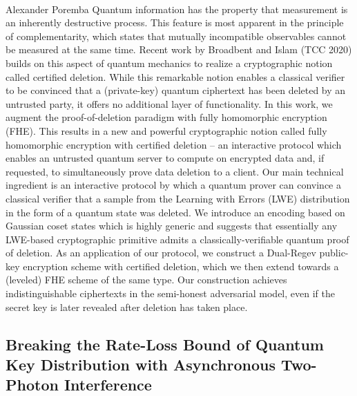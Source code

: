 \documentclass{article}%
\begin{document}
\paragraph{}%
Alexander Poremba%
Quantum information has the property that measurement is an inherently destructive process. This feature is most apparent in the principle of complementarity, which states that mutually incompatible observables cannot be measured at the same time. Recent work by Broadbent and Islam (TCC 2020) builds on this aspect of quantum mechanics to realize a cryptographic notion called certified deletion. While this remarkable notion enables a classical verifier to be convinced that a (private-key) quantum ciphertext has been deleted by an untrusted party, it offers no additional layer of functionality.   In this work, we augment the proof-of-deletion paradigm with fully homomorphic encryption (FHE). This results in a new and powerful cryptographic notion called fully homomorphic encryption with certified deletion -- an interactive protocol which enables an untrusted quantum server to compute on encrypted data and, if requested, to simultaneously prove data deletion to a client. Our main technical ingredient is an interactive protocol by which a quantum prover can convince a classical verifier that a sample from the Learning with Errors (LWE) distribution in the form of a quantum state was deleted. We introduce an encoding based on Gaussian coset states which is highly generic and suggests that essentially any LWE-based cryptographic primitive admits a classically-verifiable quantum proof of deletion. As an application of our protocol, we construct a Dual-Regev public-key encryption scheme with certified deletion, which we then extend towards a (leveled) FHE scheme of the same type. Our construction achieves indistinguishable ciphertexts in the semi-honest adversarial model, even if the secret key is later revealed after deletion has taken place.

%
\subsection{Breaking the Rate-Loss Bound of Quantum Key Distribution with   Asynchronous Two-Photon Interference}%
\label{subsec:BreakingtheRate{-}LossBoundofQuantumKeyDistributionwithAsynchronousTwo{-}PhotonInterference}%
\end{document}
